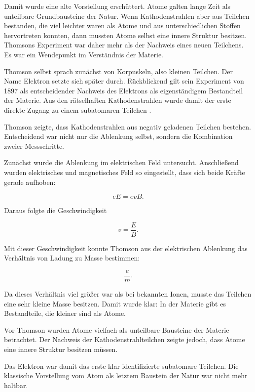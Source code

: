 Damit wurde eine alte Vorstellung erschüttert. Atome galten lange
Zeit als unteilbare Grundbausteine der Natur. Wenn Kathodenstrahlen aber aus
Teilchen bestanden, die viel leichter waren als Atome und aus unterschiedlichen
Stoffen hervortreten konnten, dann mussten Atome selbst eine innere Struktur
besitzen. Thomsons Experiment war daher mehr als der Nachweis eines neuen
Teilchens. Es war ein Wendepunkt im Verständnis der Materie.

Thomson selbst sprach zunächst von \glqq Korpuskeln\grqq, also kleinen
Teilchen. Der Name Elektron setzte sich später durch. Rückblickend gilt sein
Experiment von 1897 als entscheidender Nachweis des Elektrons als
eigenständigem Bestandteil der Materie. Aus den rätselhaften Kathodenstrahlen
wurde damit der erste direkte Zugang zu einem subatomaren Teilchen
.

\begin{PhysicsBox}
	\label{box:thomson-entscheidende-idee}
	Thomson zeigte, dass Kathodenstrahlen aus negativ geladenen Teilchen
	bestehen. Entscheidend war nicht nur die Ablenkung selbst, sondern die
	Kombination zweier Messschritte.
	
	Zunächst wurde die Ablenkung im elektrischen Feld untersucht. Anschließend
	wurden elektrisches und magnetisches Feld so eingestellt, dass sich beide
	Kräfte gerade aufhoben:
	
	\[
	eE = evB.
	\]
	
	Daraus folgte die Geschwindigkeit
	
	\[
	v = \frac{E}{B}.
	\]
	
	Mit dieser Geschwindigkeit konnte Thomson aus der elektrischen Ablenkung
	das Verhältnis von Ladung zu Masse bestimmen:
	
	\[
	\frac{e}{m}.
	\]
	
	Da dieses Verhältnis viel größer war als bei bekannten Ionen, musste das
	Teilchen eine sehr kleine Masse besitzen. Damit wurde klar: In der Materie
	gibt es Bestandteile, die kleiner sind als Atome.
\end{PhysicsBox}

\begin{HistoryBox}
	\label{box:thomson-atomvorstellung}
	Vor Thomson wurden Atome vielfach als unteilbare Bausteine der Materie
	betrachtet. Der Nachweis der Kathodenstrahlteilchen zeigte jedoch, dass
	Atome eine innere Struktur besitzen müssen.
	
	Das Elektron war damit das erste klar identifizierte subatomare Teilchen.
	Die klassische Vorstellung vom Atom als letztem Baustein der Natur war
	nicht mehr haltbar.
\end{HistoryBox}